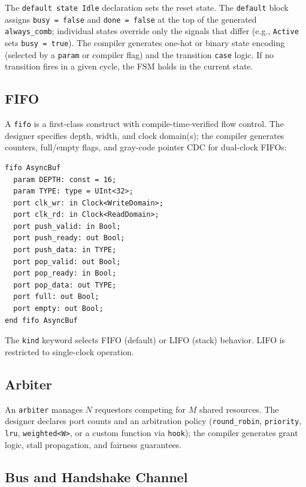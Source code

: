 \documentclass[manuscript]{acmart}
\begin{document}
The \texttt{default state Idle} declaration sets the reset state. The \texttt{default} block assigns \texttt{busy = false} and \texttt{done = false} at the top of the generated \texttt{always\_comb}; individual states override only the signals that differ (e.g., \texttt{Active} sets \texttt{busy = true}). The compiler generates one-hot or binary state encoding (selected by a \texttt{param} or compiler flag) and the transition \texttt{case} logic. If no transition fires in a given cycle, the FSM holds in the current state.

\subsection{FIFO}

A \texttt{fifo} is a first-class construct with compile-time-verified flow control. The designer specifies depth, width, and clock domain(s); the compiler generates counters, full/empty flags, and gray-code pointer CDC for dual-clock FIFOs:

\begin{lstlisting}[language=Arch,caption={Dual-clock FIFO},label={lst:fifo}]
fifo AsyncBuf
  param DEPTH: const = 16;
  param TYPE: type = UInt<32>;
  port clk_wr: in Clock<WriteDomain>;
  port clk_rd: in Clock<ReadDomain>;
  port push_valid: in Bool;
  port push_ready: out Bool;
  port push_data: in TYPE;
  port pop_valid: out Bool;
  port pop_ready: in Bool;
  port pop_data: out TYPE;
  port full: out Bool;
  port empty: out Bool;
end fifo AsyncBuf
\end{lstlisting}

The \texttt{kind} keyword selects FIFO (default) or LIFO (stack) behavior. LIFO is restricted to single-clock operation.

\subsection{Arbiter}

An \texttt{arbiter} manages $N$ requestors competing for $M$ shared resources. The designer declares port counts and an arbitration policy (\texttt{round\_robin}, \texttt{priority}, \texttt{lru}, \texttt{weighted<W>}, or a custom function via \texttt{hook}); the compiler generates grant logic, stall propagation, and fairness guarantees.

\subsection{Bus and Handshake Channel}\label{sec:bus}
\end{document}
